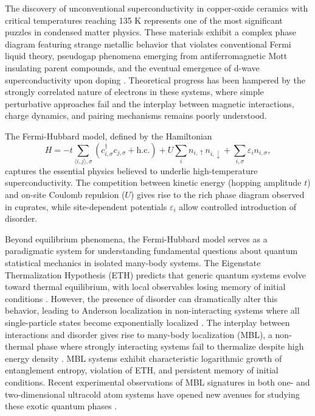 
The discovery of unconventional superconductivity in copper-oxide ceramics with critical temperatures reaching 135 K represents one of the most significant puzzles in condensed matter physics. These materials exhibit a complex phase diagram featuring strange metallic behavior that violates conventional Fermi liquid theory, pseudogap phenomena emerging from antiferromagnetic Mott insulating parent compounds, and the eventual emergence of d-wave superconductivity upon doping \cite{koepsell_quantum_2021}. Theoretical progress has been hampered by the strongly correlated nature of electrons in these systems, where simple perturbative approaches fail and the interplay between magnetic interactions, charge dynamics, and pairing mechanisms remains poorly understood.

The Fermi-Hubbard model, defined by the Hamiltonian
\begin{equation}
H = -t \sum_{\langle i,j \rangle, \sigma} \left( c_{i,\sigma}^\dagger c_{j,\sigma} + \text{h.c.} \right) + U \sum_i n_{i,\uparrow} n_{i,\downarrow} + \sum_{i,\sigma} \varepsilon_i n_{i,\sigma},
\end{equation}
captures the essential physics believed to underlie high-temperature superconductivity. The competition between kinetic energy (hopping amplitude $t$) and on-site Coulomb repulsion ($U$) gives rise to the rich phase diagram observed in cuprates, while site-dependent potentials $\varepsilon_i$ allow controlled introduction of disorder.

Beyond equilibrium phenomena, the Fermi-Hubbard model serves as a paradigmatic system for understanding fundamental questions about quantum statistical mechanics in isolated many-body systems. The Eigenstate Thermalization Hypothesis (ETH) predicts that generic quantum systems evolve toward thermal equilibrium, with local observables losing memory of initial conditions \cite{deutsch_quantum_1991,srednicki_chaos_1994}. However, the presence of disorder can dramatically alter this behavior, leading to Anderson localization in non-interacting systems where all single-particle states become exponentially localized \cite{anderson_absence_1958,billy_direct_2008,roati_anderson_2008}. The interplay between interactions and disorder gives rise to many-body localization (MBL), a non-thermal phase where strongly interacting systems fail to thermalize despite high energy density \cite{basko_metalinsulator_2006,nandkishore_many-body_2015,abanin_colloquium_2019}. MBL systems exhibit characteristic logarithmic growth of entanglement entropy, violation of ETH, and persistent memory of initial conditions. Recent experimental observations of MBL signatures in both one- and two-dimensional ultracold atom systems have opened new avenues for studying these exotic quantum phases \cite{schreiber_observation_2015,choi_exploring_2016,bordia_probing_2017}.

